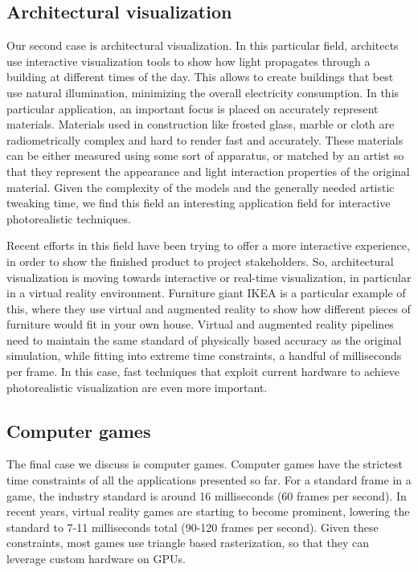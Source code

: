 \subsection{Architectural visualization}
Our second case is architectural visualization. In this particular field, architects use interactive visualization tools to show how light propagates through a building at different times of the day. This allows to create buildings that best use natural illumination, minimizing the overall electricity consumption. In this particular application, an important focus is placed on accurately represent materials. Materials used in construction like frosted glass, marble or cloth are radiometrically complex and hard to render fast and accurately. These materials can be either measured using some sort of apparatus, or matched by an artist so that they represent the appearance and light interaction properties of the original material. Given the complexity of the models and the generally needed artistic tweaking time, we find this field an interesting application field for interactive photorealistic techniques.

Recent efforts in this field have been trying to offer a more interactive experience, in order to show the finished product to project stakeholders. So, architectural visualization is moving towards interactive or real-time visualization, in particular in a virtual reality environment. Furniture giant IKEA is a particular example of this, where they use virtual and augmented reality to show how different pieces of furniture would fit in your own house. Virtual and augmented reality pipelines need to maintain the same standard of physically based accuracy as the original simulation, while fitting into extreme time constraints, a handful of milliseconds per frame. In this case, fast techniques that exploit current hardware to achieve photorealistic visualization are even more important.
\vspace{-1em}
\subsection{Computer games}
The final case we discuss is computer games. Computer games have the strictest time constraints of all the applications presented so far. For a standard frame in a game, the industry standard is around 16 milliseconds (60 frames per second). In recent years, virtual reality games are starting to become prominent, lowering the standard to 7-11 milliseconds total (90-120 frames per second). Given these constraints, most games use triangle based rasterization, so that they can leverage custom hardware on GPUs. 


